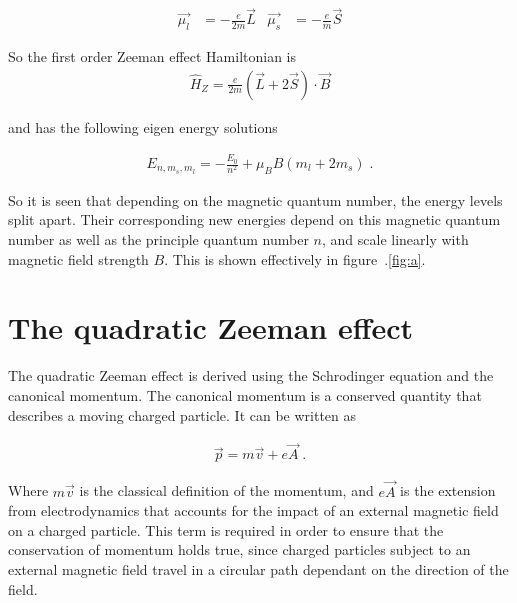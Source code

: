         \begin{align}
            \vec{\mu_l} &= - \frac{e}{2m} \vec{L} & 
            \vec{\mu_s} &= - \frac{e}{m} \vec{S}
        \end{align}

        \noindent So the first order Zeeman effect Hamiltonian is 
        \begin{align}   
            \hat{H}_Z = \frac{e}{2m} \left( \vec{L} + 2\vec{S} \right) \cdot \vec{B}            
        \end{align}

        \noindent and has the following eigen energy solutions 

        \begin{align}
            E_{n, m_s, m_l} = - \frac{E_0}{n^2} + \mu_B B(m_l + 2m_s)\;.
        \end{align}

        \noindent So it is seen that depending on the magnetic quantum number, the energy levels split apart. Their corresponding new energies depend on this magnetic quantum number as well as the principle quantum number $n$, and scale linearly with magnetic field strength $B$. This is shown effectively in figure~.\ref{fig:a}.
       
    \section{The quadratic Zeeman effect}\label{sec:quadratic_zeeman}
        The quadratic Zeeman effect is derived using the Schrodinger equation and the canonical momentum. The canonical momentum is a conserved quantity that describes a moving charged particle. It can be written as 

        \begin{align}
            \vec{p} = m\vec{v} + e\vec{A}\;.
        \end{align}

        \noindent Where $m\vec{v}$ is the classical definition of the momentum, and $e\vec{A}$ is the extension from electrodynamics that accounts for the impact of an external magnetic field on a charged particle. This term is required in order to ensure that the conservation of momentum holds true, since charged particles subject to an external magnetic field travel in a circular path dependant on the direction of the field.\\
        
